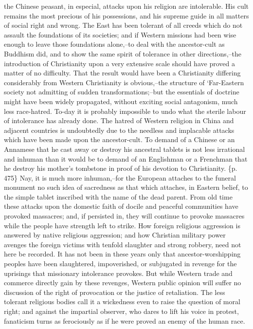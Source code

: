 the Chinese peasant, in especial, attacks upon his religion are intolerable. His cult remains the most precious of his possessions, and his supreme guide in all matters of social right and wrong. The East has been tolerant of all creeds which do not assault the foundations of its societies; and if Western missions had been wise enough to leave those foundations alone,--to deal with the ancestor-cult as Buddhism did, and to show the same spirit of tolerance in other directions,--the introduction of Christianity upon a very extensive scale should have proved a matter of no difficulty. That the result would have been a Christianity differing considerably from Western Christianity is obvious,--the structure of `Far-Eastern society not admitting of sudden transformations;--but the essentials of doctrine might have been widely propagated, without exciting social antagonism, much less race-hatred. To-day it is probably impossible to undo what the sterile labour of intolerance has already done. The hatred of Western religion in China and adjacent countries is undoubtedly due to the needless and implacable attacks which have been made upon the ancestor-cult. To demand of a Chinese or an Annamese that he cast away or destroy his ancestral tablets is not less irrational and inhuman than it would be to demand of an Englishman or a Frenchman that he destroy his mother's tombstone in proof of his devotion to Christianity. \{p. 475\} Nay, it is much more inhuman,--for the European attaches to the funeral monument no such idea of sacredness as that which attaches, in Eastern belief, to the simple tablet inscribed with the name of the dead parent. From old time these attacks upon the domestic faith of docile and peaceful communities have provoked massacres; and, if persisted in, they will continue to provoke massacres while the people have strength left to strike. How foreign religious aggression is answered by native religious aggression; and how Christian military power avenges the foreign victims with tenfold slaughter and strong robbery, need not here be recorded. It has not been in these years only that ancestor-worshipping peoples have been slaughtered, impoverished, or subjugated in revenge for the uprisings that missionary intolerance provokes. But while Western trade and commerce directly gain by these revenges, Western public opinion will suffer no discussion of the right of provocation or the justice of retaliation. The less tolerant religious bodies call it a wickedness even to raise the question of moral right; and against the impartial observer, who dares to lift his voice in protest, fanaticism turns as ferociously as if he were proved an enemy of the human race.

